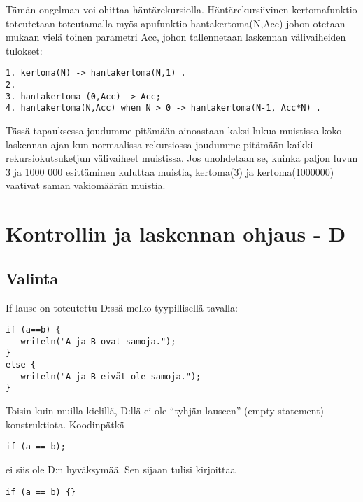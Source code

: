 \documentclass[11pt,oneside,a4paper]{article}
\begin{document}
Tämän ongelman voi ohittaa häntärekursiolla. Häntärekursiivinen kertomafunktio
toteutetaan toteutamalla myös apufunktio hantakertoma(N,Acc) johon otetaan
mukaan vielä toinen parametri Acc, johon tallennetaan laskennan 
välivaiheiden tulokset:
\begin{verbatim}
1. kertoma(N) -> hantakertoma(N,1) .
2.
3. hantakertoma (0,Acc) -> Acc;
4. hantakertoma(N,Acc) when N > 0 -> hantakertoma(N-1, Acc*N) .
\end{verbatim}


Tässä tapauksessa joudumme pitämään ainoastaan kaksi lukua muistissa koko
laskennan ajan kun normaalissa rekursiossa joudumme pitämään kaikki
rekursiokutsuketjun välivaiheet muistissa. Jos unohdetaan se, kuinka paljon
luvun 3 ja 1000 000 esittäminen kuluttaa muistia, kertoma(3) ja kertoma(1000000)
vaativat saman vakiomäärän muistia. 

\section{Kontrollin ja laskennan ohjaus - D}

\subsection{Valinta}

If-lause on toteutettu D:ssä melko tyypillisellä tavalla:

\begin{verbatim}
if (a==b) {
   writeln("A ja B ovat samoja.");
}
else {
   writeln("A ja B eivät ole samoja.");
}
\end{verbatim}

Toisin kuin muilla kielillä, D:llä ei ole ``tyhjän lauseen'' (empty statement)
konstruktiota. Koodinpätkä

\begin{verbatim}
if (a == b);
\end{verbatim}

ei siis ole D:n hyväksymää. Sen sijaan tulisi kirjoittaa

\begin{verbatim}
if (a == b) {}
\end{verbatim}
\end{document}
